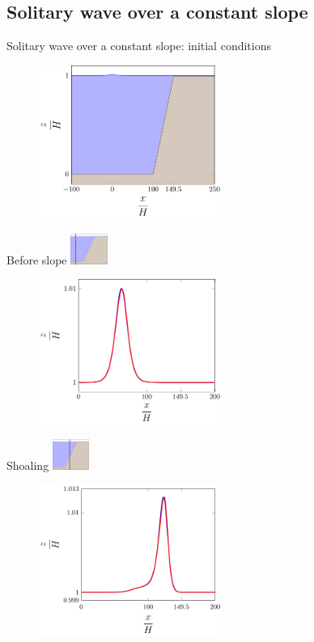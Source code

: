 \documentclass[pdf]{beamer}
\begin{document}
\subsection{Solitary wave over a constant slope}
\begin{frame}{Solitary wave over a constant slope: initial conditions}
			\begin{figure}
				\centering
				\includegraphics[width=6cm]{./Pics/Diagram/1-figure0.pdf}
			\end{figure}
			\centering
\end{frame}

\begin{frame}{Before slope \space\space \includegraphics[width=1.2cm]{./Pics/Diagram/1n-figure0.pdf} }
	\begin{figure}
		\centering
		\includegraphics[width=6cm]{./Pics/20s.pdf}
	\end{figure}
\end{frame}

\begin{frame}{Shoaling \space\space \includegraphics[width=1.2cm]{./Pics/Diagram/1n1-figure0.pdf} }
	\begin{figure}
		\includegraphics[width=6cm]{./Pics/40s.pdf}
	\end{figure}
\end{frame}
\end{document}
